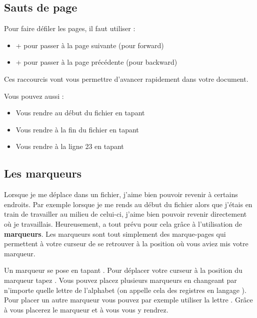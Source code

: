 \subsection{Sauts de page}

Pour faire défiler les pages, il faut utiliser :

\bigskip

\begin{itemize}
    \item \tctrl + \tf pour passer à la page suivante (\tf pour forward)
    \item \tctrl + \tb pour passer à la page précédente (\tb pour backward)
\end{itemize}

\bigskip

Ces raccourcis vont vous permettre d'avancer rapidement dans votre document. 

Vous pouvez aussi :

\begin{itemize}
    \item Vous rendre au début du fichier en tapant \tg\tg
    \item Vous rendre à la fin du fichier en tapant \tG
    \item Vous rendre à la ligne 23 en tapant \tcolon{}
\end{itemize}

\subsection{Les marqueurs}

Lorsque je me déplace dans un fichier, j'aime bien pouvoir revenir à certains endroits. Par exemple lorsque je me rends au début du fichier alors que j'étais en train de travailler au milieu de celui-ci, j'aime bien pouvoir revenir directement où je travaillais. Heureusement, \vim a tout prévu pour cela grâce à l'utilisation de \textbf{marqueurs}. Les marqueurs sont tout simplement des \og marque-pages \fg{} qui permettent à votre curseur de se retrouver à la position où vous aviez mis votre marqueur.

Un marqueur se pose en tapant \tm\ta. Pour déplacer votre curseur à la position du marqueur tapez \tapos\ta. Vous pouvez placez plusieurs marqueurs en changeant \ta par n'importe quelle lettre de l'alphabet (on appelle cela des registres en langage \vim). Pour placer un autre marqueur vous pouvez par exemple utiliser la lettre \td. Grâce à \tm\td\xspace vous placerez le marqueur et à \tapos\td\xspace vous vous y rendrez.

